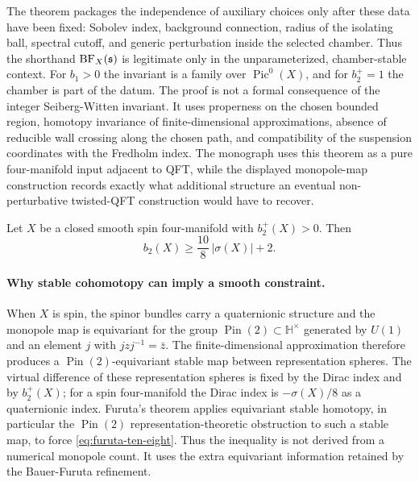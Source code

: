 The theorem packages the independence of auxiliary choices only after these
data have been fixed: Sobolev index, background connection, radius of the
isolating ball, spectral cutoff, and generic perturbation inside the selected
chamber.  Thus the shorthand \({\rm BF}_X(\mathfrak s)\) is legitimate only in
the unparameterized, chamber-stable context.  For \(b_1>0\) the invariant is a
family over \(\operatorname{Pic}^0(X)\), and for \(b_2^+=1\) the chamber is
part of the datum.  The proof is not a formal consequence of the integer
Seiberg-Witten invariant.  It uses properness on the chosen bounded region,
homotopy invariance of finite-dimensional approximations, absence of reducible
wall crossing along the chosen path, and compatibility of the suspension
coordinates with the Fredholm index.  The monograph uses this theorem as a
pure four-manifold input adjacent to QFT, while the displayed monopole-map
construction records exactly what additional structure an eventual
non-perturbative twisted-QFT construction would have to recover.

\begin{quotedtheorem}
\label{qt:furuta-ten-eight}
Let \(X\) be a closed smooth spin four-manifold with \(b_2^+(X)>0\).  Then
\begin{equation}
  b_2(X)\ge \frac{10}{8}\,|\sigma(X)|+2.
  \label{eq:furuta-ten-eight}
\end{equation}
\end{quotedtheorem}

\paragraph{Why stable cohomotopy can imply a smooth constraint.}
When \(X\) is spin, the spinor bundles carry a quaternionic structure and the
monopole map is equivariant for the group \(\operatorname{Pin}(2)\subset
\mathbb H^\times\) generated by \(U(1)\) and an element \(j\) with
\(jzj^{-1}=\bar z\).  The finite-dimensional approximation therefore produces
a \(\operatorname{Pin}(2)\)-equivariant stable map between representation
spheres.  The virtual difference of these representation spheres is fixed by
the Dirac index and by \(b_2^+(X)\); for a spin four-manifold the Dirac index
is \(-\sigma(X)/8\) as a quaternionic index.  Furuta's theorem applies
equivariant stable homotopy, in particular the \(\operatorname{Pin}(2)\)
representation-theoretic obstruction to such a stable map, to force
\eqref{eq:furuta-ten-eight}.  Thus the inequality is not derived from a
numerical monopole count.  It uses the extra equivariant information retained
by the Bauer-Furuta refinement.

